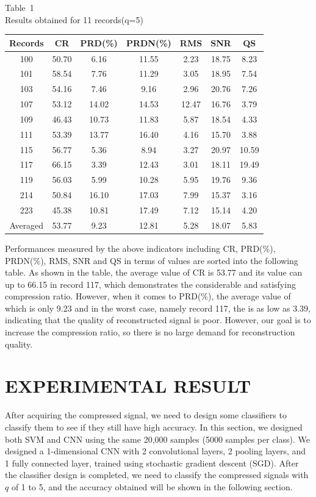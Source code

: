 \documentclass[journal]{IEEEtran}
\begin{document}
 \begin{center}
	\scriptsize
	{ Table~1\\ Results obtained for 11 records(q=5)}\\
	\label{tab:1} \vskip 3pt
    \newcommand{\rb}[1]{\raisebox{1.9ex}[-2pt]{#1}}
	\begin{tabular}{c|cccccc}
		\toprule
		Records & CR & PRD(\%) & PRDN(\%) & RMS & SNR & QS \\
		\midrule
		100  & 50.70 & 6.16 & 11.55 & 2.23 & 18.75 & 8.23 \\
		101  & 58.54 & 7.76 & 11.29 & 3.05 & 18.95 & 7.54 \\
		103  & 54.16 & 7.46 & 9.16  & 2.96 & 20.76 & 7.26 \\
		107  & 53.12 & 14.02& 14.53 & 12.47& 16.76 & 3.79 \\
		109  & 46.43 & 10.73& 11.83 & 5.87 & 18.54 & 4.33 \\
		111  & 53.39 & 13.77& 16.40 & 4.16 & 15.70 & 3.88 \\
		115  & 56.77 & 5.36 & 8.94  & 3.27 & 20.97 & 10.59\\
		117  & 66.15 & 3.39 & 12.43 & 3.01 & 18.11 & 19.49\\
		119  & 56.03 & 5.99 & 10.28 & 5.95 & 19.76 & 9.36 \\
		214  & 50.84 & 16.10& 17.03 & 7.99 & 15.37 & 3.16 \\
		223  & 45.38 & 10.81& 17.49 & 7.12 & 15.14 & 4.20 \\
		\midrule
   Averaged  & 53.77 & 9.23 & 12.81 & 5.28 & 18.07 & 5.83 \\
		\bottomrule
	\end{tabular}
\end{center}


Performances measured by the above indicators including CR, PRD(\%), PRDN(\%), RMS, SNR and QS in terms of values are sorted into the following table. As shown in the table, the average value of CR is 53.77 and its value can up to 66.15 in record 117, which demonstrates the considerable and satisfying compression ratio. However, when it comes to PRD(\%), the average value of which is only 9.23 and in the worst case, namely record 117, the is as low as 3.39, indicating that the quality of reconstructed signal is poor. However, our goal is to increase the compression ratio, so there is no large demand for reconstruction quality.

\section{EXPERIMENTAL RESULT}
After acquiring the compressed signal, we need to design some classifiers to classify them to see if they still have high accuracy. In this section, we designed both SVM and CNN  using the same 20,000 samples (5000 samples per class). We designed a 1-dimensional CNN with 2 convolutional layers, 2 pooling layers, and 1 fully connected layer, trained using stochastic gradient descent (SGD). After the classifier design is completed, we need to classify the compressed signals with $q$ of 1 to 5, and the accuracy obtained will be shown in the following section.
\end{document}
